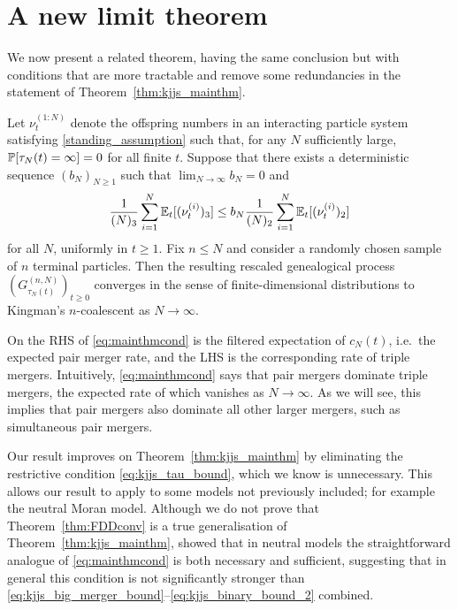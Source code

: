 \section{A new limit theorem}
We now present a related theorem, having the same conclusion but with conditions that are more tractable and remove some redundancies in the statement of Theorem~\ref{thm:kjjs_mainthm}. 

\begin{theorem}\label{thm:FDDconv}
Let $\nu_t^{(1:N)}$ denote the offspring numbers in an interacting particle system satisfying \ref{standing_assumption} such that, for any $N$ sufficiently large, $\mathbb{P}[ \tau_N(t) = \infty ] =0$ for all finite $t$. Suppose that there exists a deterministic sequence $(b_N)_{N\geq1}$ such that ${\lim}_{N\to\infty} b_N =0$ and
\begin{equation}\label{eq:mainthmcond}
\frac{1}{(N)_3} \sum_{i = 1}^N \mathbb{E}_t[ (\nu_t^{(i)})_3 ]  \leq b_N \frac{1}{(N)_2} \sum_{i = 1}^N \mathbb{E}_t[ (\nu_t^{(i)})_2 ]
\end{equation}
for all $N$, uniformly in $t \geq 1$.
Fix $n\leq N$ and consider a randomly chosen sample of $n$ terminal particles.
Then the resulting rescaled genealogical process $(G_{\tau_N(t)}^{(n,N)})_{t\geq0}$ converges in the sense of finite-dimensional distributions to Kingman's $n$-coalescent as $N \to \infty$.
\end{theorem}

On the RHS of \eqref{eq:mainthmcond} is the filtered expectation of $c_N(t)$, i.e.\ the expected pair merger rate, and the LHS is the corresponding rate of triple mergers. Intuitively, \eqref{eq:mainthmcond} says that pair mergers dominate triple mergers, the expected rate of which vanishes as $N\to\infty$. As we will see, this implies that pair mergers also dominate all other larger mergers, such as simultaneous pair mergers.

Our result improves on Theorem~\ref{thm:kjjs_mainthm} by eliminating the restrictive condition \eqref{eq:kjjs_tau_bound}, which 
we know is unnecessary. This allows our result to apply to some models not previously included; for example the neutral Moran model. %
Although we do not prove that Theorem~\ref{thm:FDDconv} is a true generalisation of Theorem~\ref{thm:kjjs_mainthm}, \textcite[Theorem 5.4]{mohle2003} showed that in neutral models the straightforward analogue of \eqref{eq:mainthmcond} is both necessary and sufficient, suggesting that in general this condition is not significantly stronger than \eqref{eq:kjjs_big_merger_bound}--\eqref{eq:kjjs_binary_bound_2} combined.

